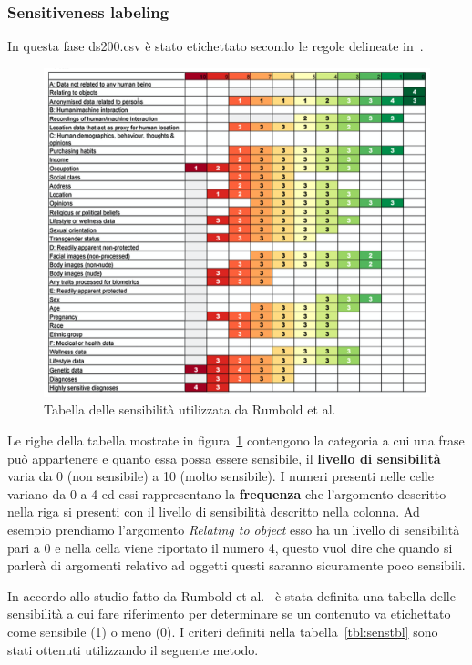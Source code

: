 \subsubsection{Sensitiveness labeling}
\label{sssec:sens_labeling}
In questa fase ds200.csv è stato etichettato secondo le regole delineate in~\cite{dataSpectrum}.
\begin{figure}
    \centering
    \includegraphics[scale=0.4]{Figure/sensTbl.png}
    \caption{Tabella delle sensibilità utilizzata da Rumbold et al.~\cite{dataSpectrum}}
    \label{fig:sensRumboldd}
\end{figure}
\FloatBarrier
Le righe della tabella mostrate in figura~\ref{fig:sensRumboldd} contengono la categoria a cui una frase può appartenere e quanto essa possa essere sensibile, il \textbf{livello di sensibilità} varia da 0 (non sensibile) a 10 (molto sensibile). I numeri presenti nelle celle variano da 0 a 4 ed essi rappresentano la \textbf{frequenza} che l'argomento descritto nella riga si presenti con il livello di sensibilità descritto nella colonna. Ad esempio prendiamo l'argomento \textit{Relating to object} esso ha un livello di sensibilità pari a 0 e nella cella viene riportato il numero 4, questo vuol dire che quando si parlerà di argomenti relativo ad oggetti questi saranno sicuramente poco sensibili.


In accordo allo studio fatto da Rumbold et al.~\cite{dataSpectrum} è stata definita una tabella delle sensibilità a cui fare riferimento per determinare se un contenuto va etichettato come sensibile (1) o meno (0). I criteri definiti nella tabella~\ref{tbl:senstbl} sono stati ottenuti utilizzando il seguente metodo.


